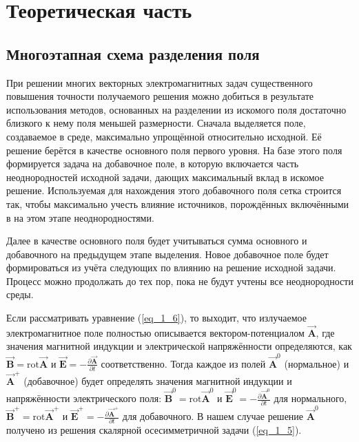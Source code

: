 \chapter{Теоретическая часть}

\section{Многоэтапная схема разделения поля}

При решении многих векторных электромагнитных задач существенного повышения точности получаемого решения можно добиться в результате использования методов, основанных на разделении из искомого поля достаточно близкого к нему поля меньшей размерности. Сначала выделяется поле, создаваемое в среде, максимально упрощённой относительно исходной. Её решение берётся в качестве основного поля первого уровня. На базе этого поля формируется задача на добавочное поле, в которую включается часть неоднородностей исходной задачи, дающих максимальный вклад в искомое решение. Используемая для нахождения этого добавочного поля сетка строится так, чтобы максимально учесть влияние источников, порождённых включёнными в на этом этапе неоднородностями.

Далее в качестве основного поля будет учитываться сумма основного и добавочного на предыдущем этапе выделения. Новое добавочное поле будет формироваться из учёта следующих по влиянию на решение исходной задачи. Процесс можно продолжать до тех пор, пока не будут учтены все неоднородности среды.

Если рассматривать уравнение (\ref{eq_1_6}), то выходит, что излучаемое электромагнитное поле полностью описывается вектором-потенциалом $\overrightarrow{\textbf{A}}$, где значения магнитной индукции и электрической напряжённости определяются, как $\overrightarrow{\textbf{B}} = \text{rot} \overrightarrow{\textbf{A}}$ и $\overrightarrow{\textbf{E}} = -\frac{\partial \overrightarrow{\textbf{A}}}{\partial t}$ соответственно. Тогда каждое из полей $\overrightarrow{\textbf{A}}^{0}$ (нормальное) и $\overrightarrow{\textbf{A}}^{+}$ (добавочное) будет определять значения магнитной индукции и напряжённости электрического поля: $\overrightarrow{\textbf{B}}^0 = \text{rot} \overrightarrow{\textbf{A}}^0$ и $\overrightarrow{\textbf{E}}^0 = -\frac{\partial \overrightarrow{\textbf{A}}^0}{\partial t}$ для нормального, $\overrightarrow{\textbf{B}}^+ = \text{rot} \overrightarrow{\textbf{A}}^+$ и $\overrightarrow{\textbf{E}}^+ = -\frac{\partial \overrightarrow{\textbf{A}}^+}{\partial t}$ для добавочного. В нашем случае решение $\overrightarrow{\textbf{A}}^0$ получено из решения скалярной осесимметричной задачи (\ref{eq_1_5}).

